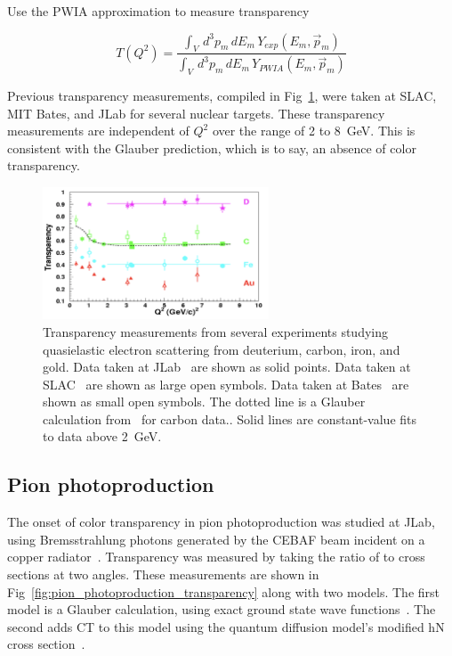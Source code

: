 Use the PWIA approximation to measure transparency

\begin{equation}
    T(Q^2) = \frac{\int_V \, d^3p_m \, dE_m \, Y_{exp}(E_m, \vec{p}_m)}
                  {\int_V \, d^3p_m \, dE_m \, Y_{PWIA}(E_m, \vec{p}_m)}
\end{equation}

Previous transparency measurements, compiled in Fig~\ref{fig:aeep}, were taken
at SLAC, MIT Bates, and JLab for several nuclear targets.
These transparency measurements are independent of $Q^2$ over the range of 2 to
\SI{8}{\giga\electronvolt}.
This is consistent with the Glauber prediction, which is to say, an absence of
color transparency.

\begin{figure}[!h]
    \centering
    \includegraphics[width=0.6\textwidth]{chap2/aeep_transparency.png}
    \caption{Transparency measurements from several experiments studying
             quasielastic electron scattering from deuterium, carbon, iron,
             and gold.
             Data taken at JLab~\cite{Abbot_1998, Garrow_2002, Rohe_2005} are shown as solid points.
             Data taken at SLAC~\cite{Makins_1994, ONeill_1995} are shown as large open symbols.
             Data taken at Bates~\cite{Garino_1992} are shown as small open symbols.
             The dotted line is a Glauber calculation from~\cite{Pandharipande_1992} for carbon data..
             Solid lines are constant-value fits to data above \SI{2}{\giga\electronvolt}.
            }
    \label{fig:aeep}
\end{figure}


\subsection{Pion photoproduction}
The onset of color transparency in pion photoproduction was studied at JLab,
using Bremsstrahlung photons generated by the CEBAF beam incident on a copper
radiator~\cite{Dutta_2003}.
Transparency was measured by taking the ratio of  to  cross sections at two
angles.
These measurements are shown in Fig~\ref{fig:pion_photoproduction_transparency}
along with two models.
The first model is a Glauber calculation, using exact ground state wave
functions~\cite{Arriaga_1995}.
The second adds CT to this model using the quantum diffusion model's modified hN
cross section~\cite{Farrar_1988}.

